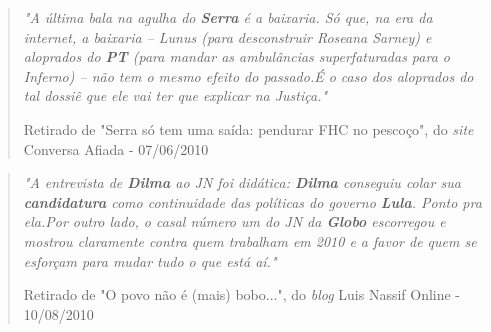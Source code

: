 \begin{quote}

\emph{"A última bala na agulha do \textbf{Serra} é a baixaria. Só que, na era da internet, a baixaria – Lunus (para desconstruir Roseana Sarney) e aloprados do \textbf{PT} (para mandar as ambulâncias superfaturadas para o Inferno) – não tem o mesmo efeito do passado.É o caso dos aloprados do tal dossiê que ele vai ter que explicar na Justiça."}

{\small Retirado de "Serra só tem uma saída: pendurar FHC no pescoço", do \emph{site} Conversa Afiada - 07/06/2010}
\end{quote}

\begin{quote}
\emph{"A entrevista de \textbf{Dilma} ao JN foi didática: \textbf{Dilma} conseguiu colar sua \textbf{candidatura} como continuidade das políticas do governo \textbf{Lula}. Ponto pra ela.Por outro lado, o casal número um do JN da \textbf{Globo} escorregou e mostrou claramente contra quem trabalham em 2010 e a favor de quem se esforçam para mudar tudo o que está aí."}

{\small Retirado de "O povo não é (mais) bobo...", do \emph{blog} Luis Nassif Online - 10/08/2010}
\end{quote}











